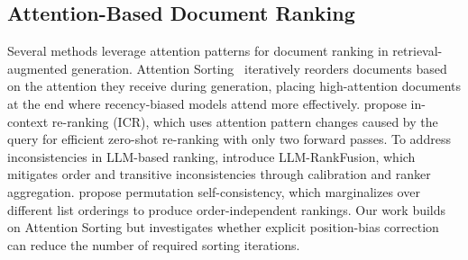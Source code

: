 \subsection{Attention-Based Document Ranking}

Several methods leverage attention patterns for document ranking in retrieval-augmented generation. Attention Sorting~\citep{Peysakhovich2023AttentionSC} iteratively reorders documents based on the attention they receive during generation, placing high-attention documents at the end where recency-biased models attend more effectively. \citet{Chen2024AttentionIL} propose in-context re-ranking (ICR), which uses attention pattern changes caused by the query for efficient zero-shot re-ranking with only two forward passes. To address inconsistencies in LLM-based ranking, \citet{Zeng2024LLMRankFusionMI} introduce LLM-RankFusion, which mitigates order and transitive inconsistencies through calibration and ranker aggregation. \citet{Tang2023FoundIT} propose permutation self-consistency, which marginalizes over different list orderings to produce order-independent rankings. Our work builds on Attention Sorting but investigates whether explicit position-bias correction can reduce the number of required sorting iterations.

